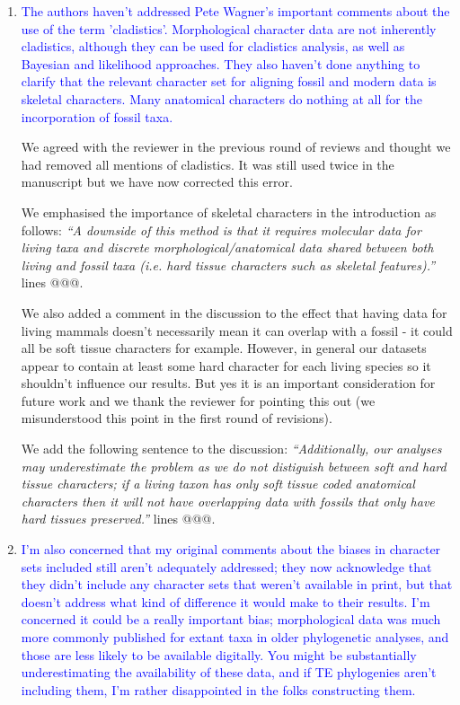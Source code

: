 \documentclass[12pt,letterpaper]{article}
\begin{document}
\begin{enumerate}
\item{\textcolor{blue}{The authors haven't addressed Pete Wagner's important comments about the use of the term 'cladistics'. Morphological character data are not inherently cladistics, although they can be used for cladistics analysis, as well as Bayesian and likelihood approaches. They also haven't done anything to clarify that the relevant character set for aligning fossil and modern data is skeletal characters. Many anatomical characters do nothing at all for the incorporation of fossil taxa.}}

We agreed with the reviewer in the previous round of reviews and thought we had removed all mentions of cladistics. It was still used twice in the manuscript but we have now corrected this error.

We emphasised the importance of skeletal characters in the introduction as follows:
\textit{``A downside of this method is that it requires molecular data for living taxa and discrete morphological/anatomical data shared between both living and fossil taxa (i.e. hard tissue characters such as skeletal features).''}
lines @@@.


We also added a comment in the discussion to the effect that having data for living mammals doesn't necessarily mean it can overlap with a fossil - it could all be soft tissue characters for example. However, in general our datasets appear to contain at least some hard character for each living species so it shouldn't influence our results. But yes it is an important consideration for future work and we thank the reviewer for pointing this out (we misunderstood this point in the first round of revisions). 

We add the following sentence to the discussion:
\textit{``Additionally, our analyses may underestimate the problem as we do not distiguish between soft and hard tissue characters; if a living taxon has only soft tissue coded anatomical characters then it will not have overlapping data with fossils that only have hard tissues preserved.''}
lines @@@.

\item{\textcolor{blue}{I'm also concerned that my original comments about the biases in character sets included still aren't adequately addressed; they now acknowledge that they didn't include any character sets that weren't available in print, but that doesn't address what kind of difference it would make to their results. I'm concerned it could be a really important bias; morphological data was much more commonly published for extant taxa in older phylogenetic analyses, and those are less likely to be available digitally. You might be substantially underestimating the availability of these data, and if TE phylogenies aren't including them, I'm rather disappointed in the folks constructing them. }}


\end{enumerate}
\end{document}
